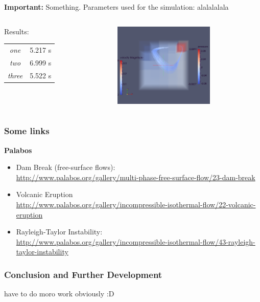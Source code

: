 \documentclass{beamer}
\begin{document}
\begin{frame}
\begin{alertblock}{{\bf Important: } Something.} 
Parameters used for the simulation: alalalalala
\end{alertblock}
\vspace{0.7cm}
\begin{columns}
\begin{column}{0.47\textwidth}
Results:
\vspace{0.4cm}
\begin{tabular}{|c||c|}\hline
\it one & 5.217 s \\
\it two & 6.999 s \\
\it three & 5.522 s \\
\hline
\end{tabular}

\end{column}
\begin{column}{0.5\textwidth}
\flushright
\includegraphics[height=4cm]{simpleCavity.png}
\end{column}
\end{columns}
\end{frame}


\begin{frame}
\frametitle{Some links}  %
{\Large \bf Palabos}\\
\begin{itemize}
\item Dam Break (free-surface flows): \\
\url{http://www.palabos.org/gallery/multi-phase-free-surface-flow/23-dam-break}
\item Volcanic Eruption \\
\url{http://www.palabos.org/gallery/incompressible-isothermal-flow/22-volcanic-eruption}
\item Rayleigh-Taylor Instability: \\
\url{http://www.palabos.org/gallery/incompressible-isothermal-flow/43-rayleigh-taylor-instability}
\end{itemize}
\end{frame}


\begin{frame}
\frametitle{Conclusion and Further Development}
have to do moro work obviously :D
\end{frame}
\end{document}
